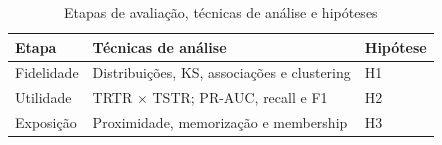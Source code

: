 \begin{table}[htb]
  \caption{Etapas de avaliação, técnicas de análise e hipóteses}
  \label{tab:avaliacao}
  \centering
  \begin{tabular}{lll}
    \toprule
    \textbf{Etapa} & \textbf{Técnicas de análise} & \textbf{Hipótese} \\
    \midrule
    Fidelidade & Distribuições, KS, associações e clustering & H1 \\
    Utilidade  & TRTR $\times$ TSTR; PR-AUC, recall e F1     & H2 \\
    Exposição  & Proximidade, memorização e membership       & H3 \\
    \bottomrule
  \end{tabular}
\end{table}

